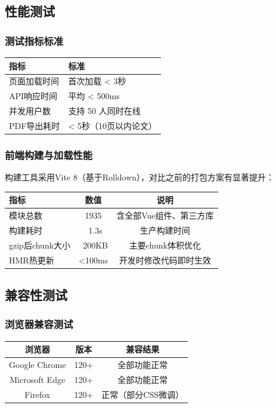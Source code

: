 \documentclass[a4paper,12pt]{article}
\begin{document}
\subsection{性能测试}
\subsubsection{测试指标标准}
\begin{center}
\begin{tabular}{|l|l|}
\hline
指标 & 标准 \\
\hline
页面加载时间 & 首次加载 < 3秒 \\
API响应时间 & 平均 < 500ms \\
并发用户数 & 支持 50 人同时在线 \\
PDF导出耗时 & < 5秒（10页以内论文） \\
\hline
\end{tabular}
\end{center}

\subsubsection{前端构建与加载性能}
构建工具采用Vite 8（基于Rolldown），对比之前的打包方案有显著提升：
\begin{center}
\begin{tabular}{|l|c|c|}
\hline
指标 & 数值 & 说明 \\
\hline
模块总数 & 1935 & 含全部Vue组件、第三方库 \\
构建耗时 & ~1.3s & 生产构建时间 \\
gzip后chunk大小 & ~200KB & 主要chunk体积优化 \\
HMR热更新 & <100ms & 开发时修改代码即时生效 \\
\hline
\end{tabular}
\end{center}

\subsection{兼容性测试}
\subsubsection{浏览器兼容测试}
\begin{center}
\begin{tabular}{|c|c|c|}
\hline
浏览器 & 版本 & 兼容结果 \\
\hline
Google Chrome & 120+ & 全部功能正常 \\
Microsoft Edge & 120+ & 全部功能正常 \\
Firefox & 120+ & 正常（部分CSS微调） \\
\hline
\end{tabular}
\end{center}
\end{document}
